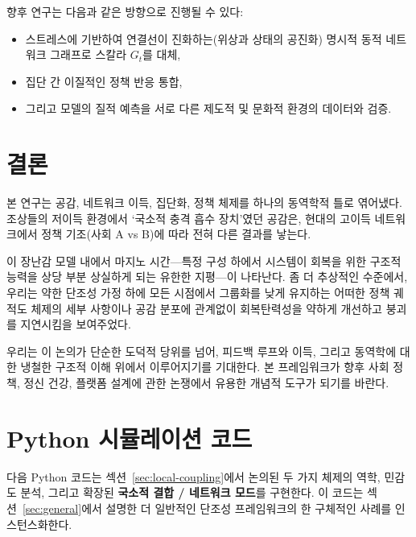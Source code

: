 \documentclass[11pt]{article}
\theoremstyle{plain}
\begin{document}
향후 연구는 다음과 같은 방향으로 진행될 수 있다:
\begin{itemize}
  \item 스트레스에 기반하여 연결선이 진화하는(위상과 상태의 공진화) 명시적 동적 네트워크 그래프로 스칼라 $G_t$를 대체,
  \item 집단 간 이질적인 정책 반응 통합,
  \item 그리고 모델의 질적 예측을 서로 다른 제도적 및 문화적 환경의 데이터와 검증.
\end{itemize}

\section{결론}

본 연구는 공감, 네트워크 이득, 집단화, 정책 체제를 하나의 동역학적 틀로 엮어냈다.
조상들의 저이득 환경에서 `국소적 충격 흡수 장치'였던 공감은, 현대의 고이득 네트워크에서 정책 기조(사회 A vs B)에 따라 전혀 다른 결과를 낳는다.

이 장난감 모델 내에서 마지노 시간—특정 구성 하에서 시스템이 회복을 위한 구조적 능력을 상당 부분 상실하게 되는 유한한 지평—이 나타난다.
좀 더 추상적인 수준에서, 우리는 약한 단조성 가정 하에 모든 시점에서 그룹화를 낮게 유지하는 어떠한 정책 궤적도 체제의 세부 사항이나 공감 분포에 관계없이 회복탄력성을 약하게 개선하고 붕괴를 지연시킴을 보여주었다.

우리는 이 논의가 단순한 도덕적 당위를 넘어, 피드백 루프와 이득, 그리고 동역학에 대한 냉철한 구조적 이해 위에서 이루어지기를 기대한다.
본 프레임워크가 향후 사회 정책, 정신 건강, 플랫폼 설계에 관한 논쟁에서 유용한 개념적 도구가 되기를 바란다.

\appendix

\section{Python 시뮬레이션 코드}
\label{app:code}

다음 Python 코드는 섹션~\ref{sec:local-coupling}에서 논의된 두 가지 체제의 역학, 민감도 분석, 그리고 확장된 \textbf{국소적 결합 / 네트워크 모드}를 구현한다.
이 코드는 섹션~\ref{sec:general}에서 설명한 더 일반적인 단조성 프레임워크의 한 구체적인 사례를 인스턴스화한다.
\end{document}
